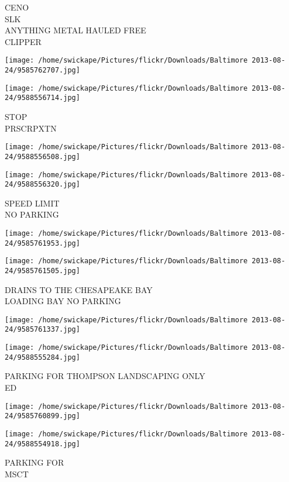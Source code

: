 \documentclass[10pt,letterpaper]{article}
\begin{document}
CENO\\
SLK\\
ANYTHING METAL HAULED FREE\\
CLIPPER
\pagebreak

\texttt{[image: /home/swickape/Pictures/flickr/Downloads/Baltimore 2013-08-24/9585762707.jpg]}

\vspace{0.25in}
\texttt{[image: /home/swickape/Pictures/flickr/Downloads/Baltimore 2013-08-24/9588556714.jpg]}

STOP\\
PRSCRPXTN
\pagebreak

\texttt{[image: /home/swickape/Pictures/flickr/Downloads/Baltimore 2013-08-24/9588556508.jpg]}

\vspace{0.25in}
\texttt{[image: /home/swickape/Pictures/flickr/Downloads/Baltimore 2013-08-24/9588556320.jpg]}

SPEED LIMIT\\
NO PARKING
\pagebreak

\texttt{[image: /home/swickape/Pictures/flickr/Downloads/Baltimore 2013-08-24/9585761953.jpg]}

\vspace{0.25in}
\texttt{[image: /home/swickape/Pictures/flickr/Downloads/Baltimore 2013-08-24/9585761505.jpg]}

DRAINS TO THE CHESAPEAKE BAY\\
LOADING BAY NO PARKING
\pagebreak

\texttt{[image: /home/swickape/Pictures/flickr/Downloads/Baltimore 2013-08-24/9585761337.jpg]}

\vspace{0.25in}
\texttt{[image: /home/swickape/Pictures/flickr/Downloads/Baltimore 2013-08-24/9588555284.jpg]}

PARKING FOR THOMPSON LANDSCAPING ONLY\\
ED
\pagebreak

\texttt{[image: /home/swickape/Pictures/flickr/Downloads/Baltimore 2013-08-24/9585760899.jpg]}

\vspace{0.25in}
\texttt{[image: /home/swickape/Pictures/flickr/Downloads/Baltimore 2013-08-24/9588554918.jpg]}

PARKING FOR\\
MSCT
\pagebreak
\end{document}
